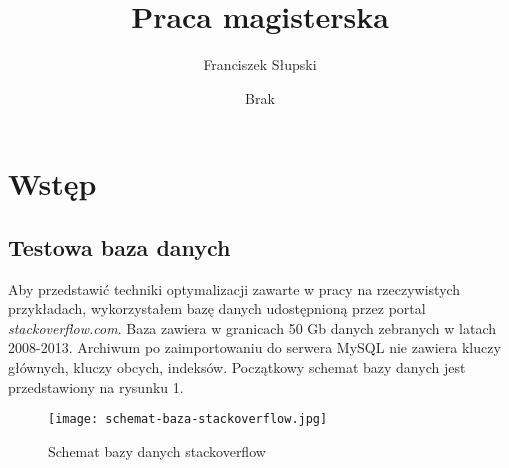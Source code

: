 \documentclass[12pt]{article}
\title{Praca magisterska}
\author{Franciszek Słupski}
\date{Brak}
\begin{document}
\maketitle

\tableofcontents
\newpage
\section{Wstęp}

\subsection{Testowa baza danych}
Aby przedstawić techniki optymalizacji zawarte w pracy na rzeczywistych przykładach, wykorzystałem bazę danych udostępnioną przez portal \textit{stackoverflow.com}. Baza zawiera w granicach 50 Gb danych zebranych w latach 2008-2013. Archiwum po zaimportowaniu do serwera MySQL nie zawiera kluczy głównych, kluczy obcych, indeksów.
Początkowy schemat bazy danych jest przedstawiony na rysunku 1.
\begin{figure}
    \texttt{[image: schemat-baza-stackoverflow.jpg]} 
    \caption{Schemat bazy danych stackoverflow}
\end{figure}


\newpage

\newpage

\newpage

\newpage

\newpage

\newpage

\newpage

\newpage

\newpage

\end{document}
